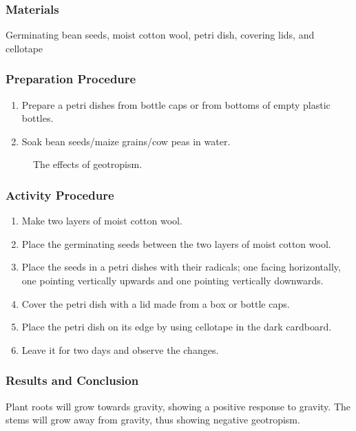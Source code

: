 \subsubsection*{Materials}
Germinating bean seeds, moist cotton wool, petri dish, covering lids, and cellotape

\subsubsection*{Preparation Procedure}
\begin{enumerate}
\item{Prepare a petri dishes from bottle caps or from bottoms of empty plastic bottles.}
\item{Soak bean seeds/maize grains/cow peas in water.}
\end{enumerate}

\begin{figure}[h]
\begin{center}
\def\svgwidth{8.5cm}

\caption{The effects of geotropism.}
\label{fig:fish}
\end{center}
\end{figure}

\subsubsection*{Activity Procedure}
\begin{enumerate}
\item{Make two layers of moist cotton wool.}
\item{Place the germinating seeds between the two layers of moist cotton wool.}
\item{Place the seeds in a petri dishes with their radicals; one facing horizontally, one pointing vertically upwards and one pointing vertically downwards.}
\item{Cover the petri dish with a lid made from a box or bottle caps.}
\item{Place the petri dish on its edge by using cellotape in the dark cardboard.}
\item{Leave it for two days and observe the changes.}
\end{enumerate}

\subsubsection*{Results and Conclusion}
Plant roots will grow towards gravity, showing a positive response to gravity. The stems will grow away from gravity, thus showing negative geotropism.

